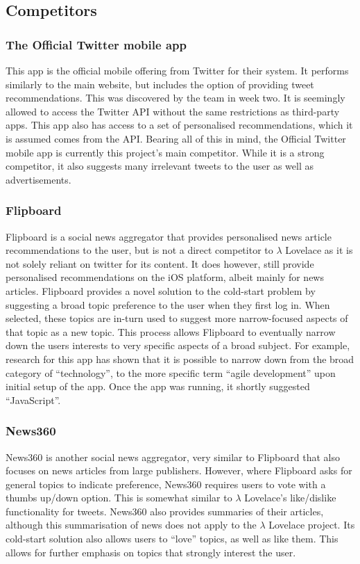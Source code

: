 \documentclass{article}
\begin{document}
\subsection{Competitors}

\subsubsection*{The Official Twitter mobile app}
This app is the official mobile offering from Twitter for their system. It performs similarly to the main website, but includes the option of providing tweet recommendations. This was discovered by the team in week two. It is seemingly allowed to access the Twitter API without the same restrictions as third-party apps. This app also has access to a set of personalised recommendations, which it is assumed comes from the API. Bearing all of this in mind, the Official Twitter mobile app is currently this project's main competitor. While it is a strong competitor, it also suggests many irrelevant tweets to the user as well as advertisements.

\subsubsection*{Flipboard}
Flipboard is a social news aggregator that provides personalised news article recommendations to the user, but is not a direct competitor to $\lambda$ Lovelace as it is not solely reliant on twitter for its content. It does however, still provide personalised recommendations on the iOS platform, albeit mainly for news articles. Flipboard provides a novel solution to the cold-start problem by suggesting a broad topic preference to the user when they first log in. When selected, these topics  are in-turn used to suggest more narrow-focused aspects of that topic as a new topic. This process allows Flipboard to eventually narrow down the users interests to very specific aspects of a broad subject. For example, research for this app has shown that it is possible to narrow down from the broad category of “technology”, to the more specific term “agile development” upon initial setup of the app. Once the app was running, it shortly suggested “JavaScript”.

\subsubsection*{News360}
News360 is another social news aggregator, very similar to Flipboard that also focuses on news articles from large publishers. However, where Flipboard asks for general topics to indicate preference,  News360 requires users to vote with a thumbs up/down option. This is somewhat similar to $\lambda$ Lovelace's like/dislike functionality for tweets. News360 also provides summaries of their articles, although this summarisation of news does not apply to the $\lambda$ Lovelace project. Its cold-start solution also allows users to “love” topics, as well as like them. This allows for further emphasis on topics that strongly interest the user.
\end{document}

